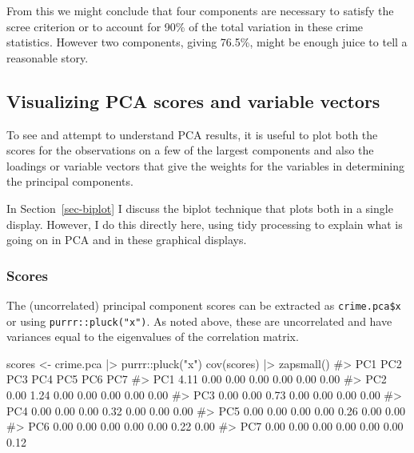 \documentclass[
  letterpaper,
  10pt,
  krantz2]{krantz}
\makeatletter
\newenvironment{Shaded}{\begin{snugshade}}{\end{snugshade}}
\newcommand{\CommentTok}[1]{\textcolor[rgb]{0.37,0.37,0.37}{#1}}
\newcommand{\FunctionTok}[1]{\textcolor[rgb]{0.28,0.35,0.67}{#1}}
\newcommand{\NormalTok}[1]{\textcolor[rgb]{0.00,0.23,0.31}{#1}}
\newcommand{\OtherTok}[1]{\textcolor[rgb]{0.00,0.23,0.31}{#1}}
\newcommand{\SpecialCharTok}[1]{\textcolor[rgb]{0.37,0.37,0.37}{#1}}
\newcommand{\StringTok}[1]{\textcolor[rgb]{0.13,0.47,0.30}{#1}}
\newenvironment{kframe}{%
  \medskip{}
  \setlength{\fboxsep}{.8em}
  \def\at@end@of@kframe{}%
  \ifinner\ifhmode%
  \def\at@end@of@kframe{\end{minipage}}%
  \begin{minipage}{\columnwidth}%
  \fi\fi%
  \def\FrameCommand##1{\hskip\@totalleftmargin \hskip-\fboxsep
  \colorbox{shadecolor}{##1}\hskip-\fboxsep
      \hskip-\linewidth \hskip-\@totalleftmargin \hskip\columnwidth}%
  \MakeFramed {\advance\hsize-\width
    \@totalleftmargin\z@ \linewidth\hsize
    \@setminipage}}%
{\par\unskip\endMakeFramed%
  \at@end@of@kframe}
\renewenvironment{Shaded}{\begin{kframe}}{\end{kframe}}
\makeatother
\begin{document}
From this we might conclude that four components are necessary to
satisfy the scree criterion or to account for 90\% of the total
variation in these crime statistics. However two components, giving
76.5\%, might be enough juice to tell a reasonable story.

\subsection{Visualizing PCA scores and variable
vectors}\label{visualizing-pca-scores-and-variable-vectors}

To see and attempt to understand PCA results, it is useful to plot both
the scores for the observations on a few of the largest components and
also the loadings or variable vectors that give the weights for the
variables in determining the principal components.

In Section~\ref{sec-biplot} I discuss the biplot technique that plots
both in a single display. However, I do this directly here, using tidy
processing to explain what is going on in PCA and in these graphical
displays.

\subsubsection*{Scores}\label{scores}

The (uncorrelated) principal component scores can be extracted as
\texttt{crime.pca\$x} or using \texttt{purrr::pluck("x")}. As noted
above, these are uncorrelated and have variances equal to the
eigenvalues of the correlation matrix.

\begin{Shaded}
\begin{Highlighting}[]
\NormalTok{scores }\OtherTok{\textless{}{-}}\NormalTok{ crime.pca }\SpecialCharTok{|\textgreater{}}\NormalTok{ purrr}\SpecialCharTok{::}\FunctionTok{pluck}\NormalTok{(}\StringTok{"x"}\NormalTok{) }
\FunctionTok{cov}\NormalTok{(scores) }\SpecialCharTok{|\textgreater{}} \FunctionTok{zapsmall}\NormalTok{()}
\CommentTok{\#\textgreater{}      PC1  PC2  PC3  PC4  PC5  PC6  PC7}
\CommentTok{\#\textgreater{} PC1 4.11 0.00 0.00 0.00 0.00 0.00 0.00}
\CommentTok{\#\textgreater{} PC2 0.00 1.24 0.00 0.00 0.00 0.00 0.00}
\CommentTok{\#\textgreater{} PC3 0.00 0.00 0.73 0.00 0.00 0.00 0.00}
\CommentTok{\#\textgreater{} PC4 0.00 0.00 0.00 0.32 0.00 0.00 0.00}
\CommentTok{\#\textgreater{} PC5 0.00 0.00 0.00 0.00 0.26 0.00 0.00}
\CommentTok{\#\textgreater{} PC6 0.00 0.00 0.00 0.00 0.00 0.22 0.00}
\CommentTok{\#\textgreater{} PC7 0.00 0.00 0.00 0.00 0.00 0.00 0.12}
\end{Highlighting}
\end{Shaded}
\end{document}

